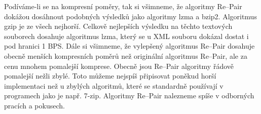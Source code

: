 \documentclass[a4paper,12pt]{article}
\begin{document}
Podíváme-li se na kompresní poměry, tak si všimneme, že algoritmy Re--Pair dokážou dosáhnout podobných výsledků jako algoritmy lzma a bzip2. Algoritmus gzip je ze všech nejhorší. Celkově nejlepších výsledku na těchto textových souborech dosahuje algoritmus lzma, který se u XML souboru dokázal dostat i pod hranici 1 BPS. Dále si všimneme, že vylepšený algoritmus Re--Pair dosahuje obecně menších kompresních poměrů než originální algoritmus Re--Pair, ale za cenu mnohem pomalejší komprese. Obecně jsou Re--Pair algoritmy řádově pomalejší nežli zbylé. Toto můžeme nejspíš připisovat poněkud horší implementaci než u zbylých algoritmů, které se standardně používají v programech jako je např. 7-zip. Algoritmy Re--Pair nalezneme spíše v odborných pracích a pokusech.




\end{document}
